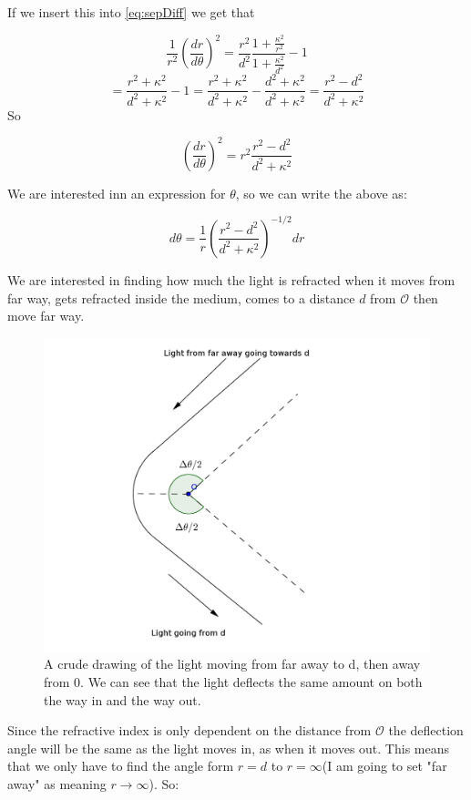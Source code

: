 \documentclass[a4paper,norsk, 10pt]{article}
\begin{document}
If we insert this into \ref{eq:sepDiff} we get that 

$$
\frac{1}{r^2}\left(\frac{dr}{d\theta}\right)^2 = \frac{r^2}{d^2}\frac{1 + \frac{\kappa^2}{r^2}}{1 + \frac{\kappa^2}{d^2}} -1
$$
$$
= \frac{r^2 + \kappa^2}{d^2+\kappa^2} - 1 = \frac{r^2 + \kappa^2}{d^2+\kappa^2} - \frac{d^2+\kappa^2}{d^2+\kappa^2} = \frac{r^2 -d^2}{d^2 +\kappa^2}
$$
So

$$
\left(\frac{dr}{d\theta}\right)^2 = r^2\frac{r^2 -d^2}{d^2 +\kappa^2}
$$


We are interested inn an expression for $\theta$, so we can write the above as:

\begin{equation}
d\theta = \frac{1}{r}\left(\frac{r^2 -d^2}{d^2 +\kappa^2}\right)^{-1/2}dr
\end{equation}


We are interested in finding how much the light is refracted when it moves from far way, gets refracted inside the medium, comes to a distance $d$ from $\mathcal{O}$ then move far way.

\begin{figure}[H]
\centering
\includegraphics[scale=0.4]{3c.png}
\caption{A crude drawing of the light moving from far away to d, then away from $\mathcal{0}$. We can see that the light deflects the same amount on both the way in and the way out.}
\end{figure}

Since the refractive index is only dependent on the distance from $\mathcal{O}$ the deflection angle will be the same as the light moves in, as when it moves out. This means that we only have to find the angle form $r = d$ to $r = \infty$(I am going to set "far away" as meaning $r\rightarrow \infty$). So:
\end{document}
